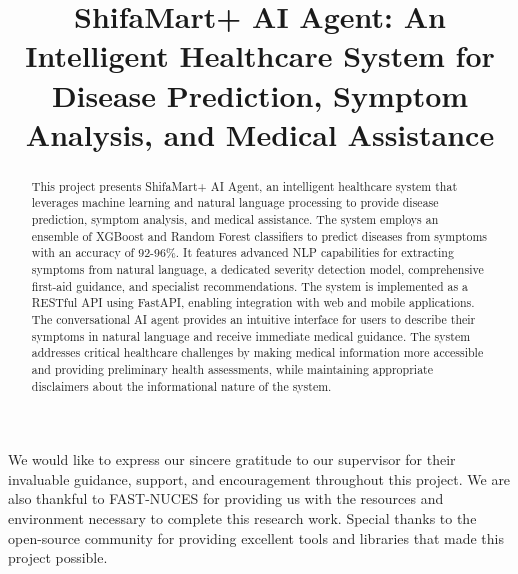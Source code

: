 \documentclass{fast-nuces-bs}
\title{ShifaMart+ AI Agent: An Intelligent Healthcare System for Disease Prediction, Symptom Analysis, and Medical Assistance}
\begin{document}
\begin{acknowledgements}
We would like to express our sincere gratitude to our supervisor for their invaluable guidance, support, and encouragement throughout this project. We are also thankful to FAST-NUCES for providing us with the resources and environment necessary to complete this research work. Special thanks to the open-source community for providing excellent tools and libraries that made this project possible.
\end{acknowledgements}

\begin{abstract}
This project presents ShifaMart+ AI Agent, an intelligent healthcare system that leverages machine learning and natural language processing to provide disease prediction, symptom analysis, and medical assistance. The system employs an ensemble of XGBoost and Random Forest classifiers to predict diseases from symptoms with an accuracy of 92-96\%. It features advanced NLP capabilities for extracting symptoms from natural language, a dedicated severity detection model, comprehensive first-aid guidance, and specialist recommendations. The system is implemented as a RESTful API using FastAPI, enabling integration with web and mobile applications. The conversational AI agent provides an intuitive interface for users to describe their symptoms in natural language and receive immediate medical guidance. The system addresses critical healthcare challenges by making medical information more accessible and providing preliminary health assessments, while maintaining appropriate disclaimers about the informational nature of the system.
\end{abstract}









\appendix

\end{document}
